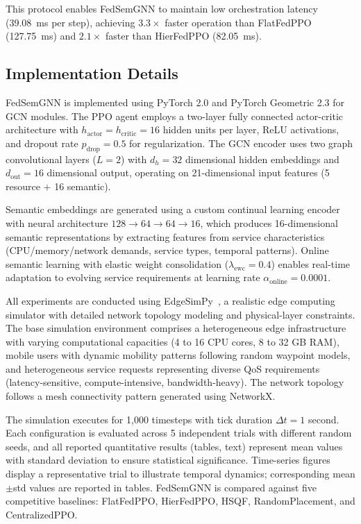 \documentclass[conference]{IEEEtran}
\begin{document}
	\textcolor{revblue}{This protocol enables FedSemGNN to maintain low orchestration latency (39.08~ms per step), achieving $3.3\times$ faster operation than FlatFedPPO (127.75~ms) and $2.1\times$ faster than HierFedPPO (82.05~ms).}
	
	\subsection{Implementation Details}
	\textcolor{revblue}{FedSemGNN is implemented using PyTorch 2.0 and PyTorch Geometric 2.3 for GCN modules. The PPO agent employs a two-layer fully connected actor-critic architecture with $h_{\text{actor}} = h_{\text{critic}} = 16$ hidden units per layer, ReLU activations, and dropout rate $p_{\text{drop}} = 0.5$ for regularization. The GCN encoder uses two graph convolutional layers ($L = 2$) with $d_h = 32$ dimensional hidden embeddings and $d_{\text{out}} = 16$ dimensional output, operating on 21-dimensional input features (5 resource $+$ 16 semantic).}
	
	Semantic embeddings are generated using a custom continual learning encoder with neural architecture $128 \rightarrow 64 \rightarrow 64 \rightarrow 16$, which produces 16-dimensional semantic representations by extracting features from service characteristics (CPU/memory/network demands, service types, temporal patterns). Online semantic learning with elastic weight consolidation ($\lambda_{\text{ewc}} = 0.4$) enables real-time adaptation to evolving service requirements at learning rate $\alpha_{\text{online}} = 0.0001$.
	
	All experiments are conducted using EdgeSimPy~\cite{souza2023edgesimpy}, a realistic edge computing simulator with detailed network topology modeling and physical-layer constraints. The base simulation environment comprises a heterogeneous edge infrastructure with varying computational capacities (4 to 16 CPU cores, 8 to 32 GB RAM), mobile users with dynamic mobility patterns following random waypoint models, and heterogeneous service requests representing diverse QoS requirements (latency-sensitive, compute-intensive, bandwidth-heavy). The network topology follows a mesh connectivity pattern generated using NetworkX.
	
	\textcolor{revblue}{The simulation executes for 1,000 timesteps with tick duration $\Delta t = 1$ second. Each configuration is evaluated across 5 independent trials with different random seeds, and all reported quantitative results (tables, text) represent mean values with standard deviation to ensure statistical significance. Time-series figures display a representative trial to illustrate temporal dynamics; corresponding mean$\pm$std values are reported in tables. FedSemGNN is compared against five competitive baselines: FlatFedPPO, HierFedPPO, HSQF, RandomPlacement, and CentralizedPPO.}
	
\end{document}
